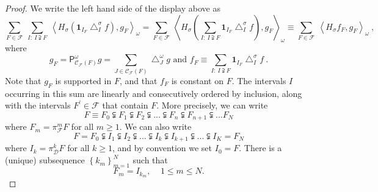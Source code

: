 \documentclass{amsart}%
\theoremstyle{plain}
\numberwithin{equation}{section}
\begin{document}
\begin{proof}
We write the left hand side of the display above as%
\[
\sum_{F\in\mathcal{F}}\ \sum_{I:\ I\supsetneqq F}\ \left\langle H_{\sigma
}\left(  \mathbf{1}_{I_{F}}\bigtriangleup_{I}^{\sigma}f\right)  ,g_{F}%
\right\rangle _{\omega}=\sum_{F\in\mathcal{F}}\ \left\langle H_{\sigma}\left(
\sum_{I:\ I\supsetneqq F}\mathbf{1}_{I_{F}}\bigtriangleup_{I}^{\sigma
}f\right)  ,g_{F}\right\rangle _{\omega}\equiv\sum_{F\in\mathcal{F}%
}\ \left\langle H_{\sigma}f_{F},g_{F}\right\rangle _{\omega}\ ,
\]
where%
\[
g_{F}=\mathsf{P}_{\mathcal{C}_{\mathcal{F}}\left(  F\right)  }^{\omega}%
g=\sum_{J\in\mathcal{C}_{\mathcal{F}}\left(  F\right)  }\bigtriangleup
_{J}^{\omega}g\text{ and }f_{F}\equiv\sum_{I:\ I\supsetneqq F}\mathbf{1}%
_{I_{F}}\bigtriangleup_{I}^{\sigma}f\ .
\]
Note that $g_{F}$ is supported in $F$, and that $f_{F}$ is constant on $F$.
The intervals $I$ occurring in this sum are linearly and consecutively ordered
by inclusion, along with the intervals $F^{\prime}\in\mathcal{F}$ that contain
$F$. More precisely, we can write%
\[
F\equiv F_{0}\subsetneqq F_{1}\subsetneqq F_{2}\subsetneqq...\subsetneqq
F_{n}\subsetneqq F_{n+1}\subsetneqq...F_{N}%
\]
where $F_{m}=\pi_{\mathcal{F}}^{m}F$ for all $m\geq1$. We can also write%
\[
F=F_{0}\subsetneqq I_{1}\subsetneqq I_{2}\subsetneqq...\subsetneqq
I_{k}\subsetneqq I_{k+1}\subsetneqq...\subsetneqq I_{K}=F_{N}%
\]
where $I_{k}=\pi_{\mathcal{D}}^{k}F$ for all $k\geq1$, and by convention we
set $I_{0}=F$. There is a (unique) subsequence $\left\{  k_{m}\right\}
_{m=1}^{N}$ such that%
\[
F_{m}=I_{k_{m}},\ \ \ \ \ 1\leq m\leq N.
\]



\end{proof}
\end{document}
